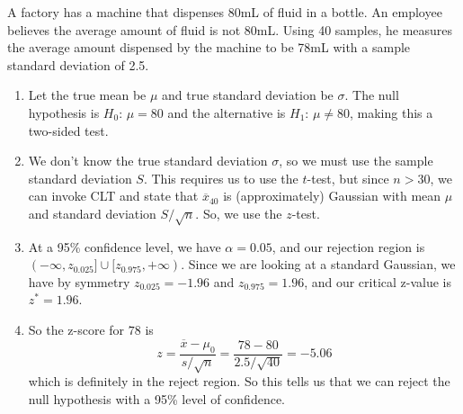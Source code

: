   \begin{example}
    A factory has a machine that dispenses 80mL of fluid in a bottle. An employee believes the average amount of fluid is not 80mL. Using 40 samples, he measures the average amount dispensed by the machine to be 78mL with a sample standard deviation of 2.5. 
    \begin{enumerate}
      \item Let the true mean be $\mu$ and true standard deviation be $\sigma$. The null hypothesis is $H_0 : \, \mu = 80$ and the alternative is $H_1 : \, \mu \neq 80$, making this a two-sided test. 
      
      \item We don't know the true standard deviation $\sigma$, so we must use the sample standard deviation $S$. This requires us to use the $t$-test, but since $n > 30$, we can invoke CLT and state that $\overline{x}_{40}$ is (approximately) Gaussian with mean $\mu$ and standard deviation $S / \sqrt{n}$. So, we use the $z$-test. 
      
      \item At a 95\% confidence level, we have $\alpha = 0.05$, and our rejection region is $(-\infty, z_{0.025}] \cup [z_{0.975}, +\infty)$. Since we are looking at a standard Gaussian, we have by symmetry $z_{0.025} = -1.96$ and $z_{0.975} = 1.96$, and our critical z-value is $z^\ast = 1.96$. 
      
      \item So the z-score for $78$ is 
      \begin{equation}
        z = \frac{\overline{x} - \mu_0}{s / \sqrt{n}} = \frac{78 - 80}{2.5 / \sqrt{40}} = -5.06
      \end{equation}
      which is definitely in the reject region. So this tells us that we can reject the null hypothesis with a 95\% level of confidence. 
    \end{enumerate}
  \end{example}

